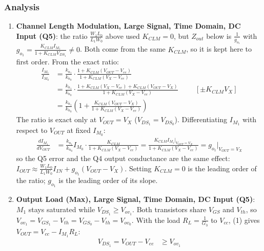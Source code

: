 \subsubsection{Analysis}
\begin{enumerate}
  \item \textbf{Channel Length Modulation, Large Signal, Time Domain, DC Input (Q5)}:
    the ratio \(\frac{W_1 L_0}{L_1 W_0}\) above used \(K_{CLM} = 0\), but \(Z_{out}\) below
    is \(\frac{1}{g_{o_1}}\) with \(g_{o_1} = \frac{K_{CLM} I_{M_1}}{1 + K_{CLM} V_{DS_1}} \neq 0\). Both come from the same
    \(K_{CLM}\), so it is kept here to first order. From the exact ratio:
    \begin{align*}
      \frac{I_{M_1}}{I_{M_0}} &= \frac{k_{n_1}}{k_{n_0}} \cdot \frac{1 + K_{CLM} (V_{OUT} - V_{ee})}{1 + K_{CLM} (V_{X} - V_{ee})} \\
      &= \frac{k_{n_1}}{k_{n_0}} \cdot \frac{1 + K_{CLM} (V_{X} - V_{ee}) + K_{CLM} (V_{OUT} - V_{X})}{1 + K_{CLM} (V_{X} - V_{ee})} \hspace{1cm} [\pm K_{CLM} V_X] \\
      &= \frac{k_{n_1}}{k_{n_0}} \left(1 + \frac{K_{CLM} (V_{OUT} - V_{X})}{1 + K_{CLM} (V_{X} - V_{ee})}\right)
    \end{align*}
    The ratio is exact only at \(V_{OUT} = V_X\) (\(V_{DS_1} = V_{DS_0}\)). Differentiating
    \(I_{M_1}\) with respect to \(V_{OUT}\) at fixed \(I_{M_0}\):
    \begin{align*}
      \frac{dI_{M_1}}{dV_{OUT}} &= \frac{k_{n_1}}{k_{n_0}} I_{M_0} \cdot \frac{K_{CLM}}{1 + K_{CLM} (V_{X} - V_{ee})}
      = \frac{K_{CLM} I_{M_1}|_{V_{OUT} = V_X}}{1 + K_{CLM} (V_{X} - V_{ee})} = g_{o_1}|_{V_{OUT} = V_X}
    \end{align*}
    so the Q5 error and the Q4 output conductance are the same effect:
    \(I_{OUT} \approx \frac{W_1 L_0}{L_1 W_0} I_{IN} + g_{o_1}(V_{OUT} - V_X)\). Setting \(K_{CLM} = 0\) is the
    leading order of the ratio; \(g_{o_1}\) is the leading order of its slope.
  \item \textbf{Output Load (Max), Large Signal, Time Domain, DC Input (Q5)}:
    \(M_1\) stays saturated while \(V_{DS_1} \geq V_{ov_1}\). Both
    transistors share \(V_{GS}\) and \(V_{th}\), so
    \(V_{ov_1} = V_{GS_1} - V_{th} = V_{GS_0} - V_{th} = V_{ov_0}\).
    With the load \(R_L = \frac{1}{G_3}\) to \(V_{cc}\), (1) gives
    \(V_{OUT} = V_{cc} - I_{M_1} R_L\):
    \begin{align*}
      V_{DS_1} = V_{OUT} - V_{ee} &\geq V_{ov_1} \\

\end{align*}
\end{enumerate}
